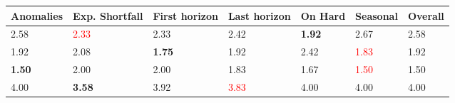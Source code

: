 \begin{tabular}{lllllll}
\toprule
Anomalies & Exp. Shortfall & First horizon & Last horizon & On Hard & Seasonal & Overall \\
\midrule
2.58 & \textcolor{red}{2.33} & 2.33 & 2.42 & \textbf{1.92} & 2.67 & 2.58 \\
1.92 & 2.08 & \textbf{1.75} & 1.92 & 2.42 & \textcolor{red}{1.83} & 1.92 \\
\textbf{1.50} & 2.00 & 2.00 & 1.83 & 1.67 & \textcolor{red}{1.50} & 1.50 \\
4.00 & \textbf{3.58} & 3.92 & \textcolor{red}{3.83} & 4.00 & 4.00 & 4.00 \\
\bottomrule
\end{tabular}
